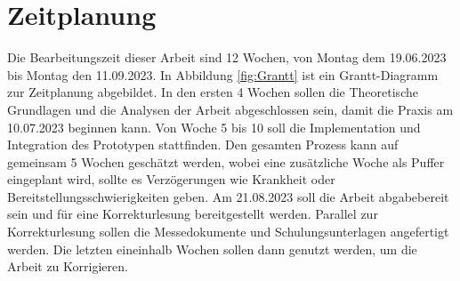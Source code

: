 \documentclass[a4paper, 12pt, oneside]{scrbook}
\begin{document}
	
	
	\section{Zeitplanung}
	
	Die Bearbeitungszeit dieser Arbeit sind 12 Wochen, von Montag dem 19.06.2023 bis Montag den 11.09.2023. In Abbildung \ref{fig:Grantt} ist ein Grantt-Diagramm zur Zeitplanung abgebildet. In den ersten 4 Wochen sollen die Theoretische Grundlagen und die Analysen der Arbeit abgeschlossen sein, damit die Praxis am 10.07.2023 beginnen kann. Von Woche 5 bis 10 soll die Implementation und Integration des Prototypen stattfinden. Den gesamten Prozess kann auf gemeinsam 5 Wochen geschätzt werden,  wobei eine zusätzliche Woche als Puffer eingeplant wird, sollte es Verzögerungen wie Krankheit oder Bereitstellungsschwierigkeiten geben. Am 21.08.2023 soll die Arbeit abgabebereit sein und für eine Korrekturlesung bereitgestellt werden. Parallel zur Korrekturlesung sollen die Messedokumente und Schulungsunterlagen angefertigt werden. Die letzten eineinhalb Wochen sollen dann genutzt werden, um die Arbeit zu Korrigieren.
	
\end{document}
